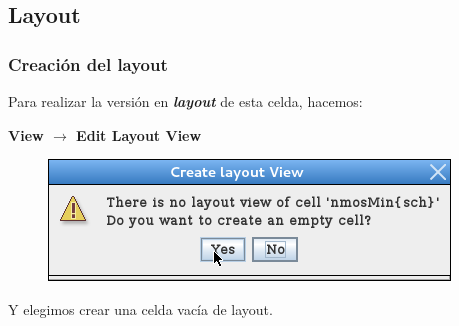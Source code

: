 \documentclass{beamer}
\begin{document}
\begin{frame}
\subsection{Layout}
\frametitle{Creación del layout}
Para realizar la versión en \textit{\textbf{layout}} de esta celda, hacemos:

\textbf{View $\rightarrow$ Edit Layout View}
\begin{figure}
  \includegraphics[width=0.50\linewidth]{figuras/edicionElectric-6.png}
\end{figure}
Y elegimos crear una celda vacía de layout.
\end{frame}
\end{document}
